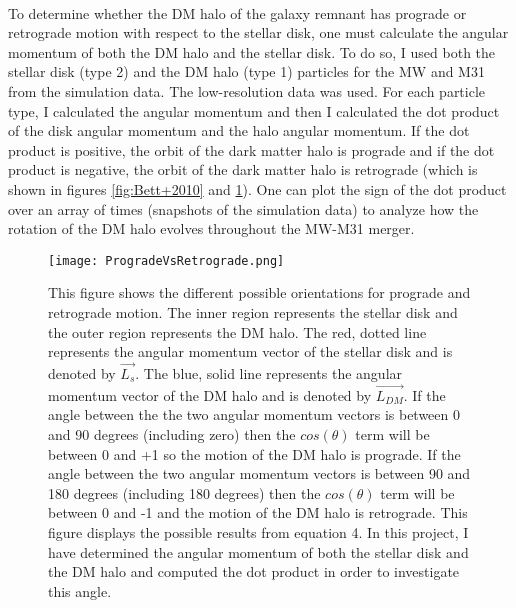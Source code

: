 \documentclass[fleqn,usenatbib]{mnras}
\begin{document}
\paragraph{} To determine whether the DM halo of the galaxy remnant has prograde or retrograde motion with respect to the stellar disk, one must calculate the angular momentum of both the DM halo and the stellar disk. To do so, I used both the stellar disk (type 2) and the DM halo (type 1) particles for the MW and M31 from the simulation data. The low-resolution data was used. For each particle type, I calculated the angular momentum and then I calculated the dot product of the disk angular momentum and the halo angular momentum. If the dot product is positive, the orbit of the dark matter halo is prograde and if the dot product is negative, the orbit of the dark matter halo is retrograde (which is shown in figures \ref{fig:Bett+2010} and \ref{fig:ProVRetro}). One can plot the sign of the dot product over an array of times (snapshots of the simulation data) to analyze how the rotation of the DM halo evolves throughout the MW-M31 merger.

\begin{figure}
    \centering
    \texttt{[image: ProgradeVsRetrograde.png]}
    \caption{This figure shows the different possible orientations for prograde and retrograde motion. The inner region represents the stellar disk and the outer region represents the DM halo. The red, dotted line represents the angular momentum vector of the stellar disk and is denoted by $\vec{L_s}$. The blue, solid line represents the angular momentum vector of the DM halo and is denoted by $\vec{L_{DM}}$. If the angle between the the two angular momentum vectors is between 0 and 90 degrees (including zero) then the $cos(\theta)$ term will be between 0 and +1 so the motion of the DM halo is prograde. If the angle between the two angular momentum vectors is between 90 and 180 degrees (including 180 degrees) then the $cos(\theta)$ term will be between 0 and -1 and the motion of the DM halo is retrograde. This figure displays the possible results from equation 4. In this project, I have determined the angular momentum of both the stellar disk and the DM halo and computed the dot product in order to investigate this angle.}
    \label{fig:ProVRetro}
\end{figure}
\end{document}
